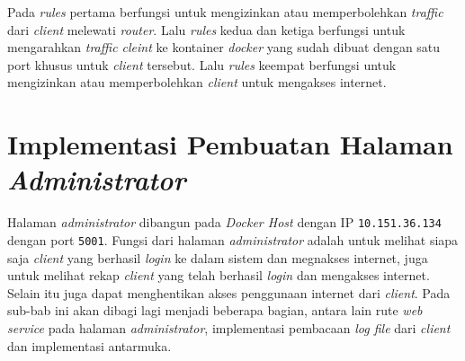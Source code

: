 Pada \textit{rules} pertama berfungsi untuk mengizinkan atau memperbolehkan \textit{traffic} dari \textit{client} melewati \textit{router}. Lalu \textit{rules} kedua dan ketiga berfungsi untuk mengarahkan \textit{traffic cleint} ke kontainer \textit{docker} yang sudah dibuat dengan satu port khusus untuk \textit{client} tersebut. Lalu \textit{rules} keempat berfungsi untuk mengizinkan atau memperbolehkan \textit{client} untuk mengakses internet.

\section{Implementasi Pembuatan Halaman \textit{Administrator}}
Halaman \textit{administrator} dibangun pada \textit{Docker Host} dengan IP \texttt{10.151.36.134} dengan port \texttt{5001}. Fungsi dari halaman \textit{administrator} adalah untuk melihat siapa saja \textit{client} yang berhasil \textit{login} ke dalam sistem dan megnakses internet, juga untuk melihat rekap \textit{client} yang telah berhasil \textit{login} dan mengakses internet. Selain itu juga dapat menghentikan akses penggunaan internet dari \textit{client}. Pada sub-bab ini akan dibagi lagi menjadi beberapa bagian, antara lain rute \textit{web service} pada halaman \textit{administrator}, implementasi pembacaan \textit{log file} dari \textit{client} dan implementasi antarmuka.

